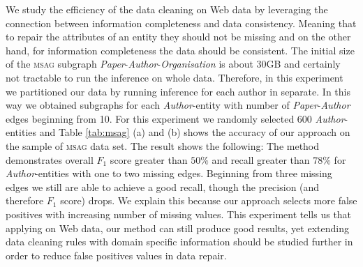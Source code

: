 We study the efficiency of the data cleaning on Web data by leveraging the connection between information completeness and data consistency. Meaning that to repair the attributes of an entity they should not be missing and on the other hand, for information completeness the data should be consistent. The initial size of the \textsc{msag} subgraph \textit{Paper}-\textit{Author}-\textit{Organisation} is about 30GB and certainly not tractable to run the inference on whole data. Therefore, in this experiment we partitioned our data by running inference for each author in separate. In this way we obtained subgraphs for each \textit{Author}-entity with number of \textit{Paper}-\textit{Author} edges beginning from 10. For this experiment we randomly selected 600 \textit{Author}-entities and Table \ref{tab:msag} (a) and (b) shows the accuracy of our approach on the sample of \textsc{msag} data set. The result shows the following: The method demonstrates overall $F_1$ score greater than $50\%$ and recall greater than $78\%$ for \textit{Author}-entities with one to two missing edges. Beginning from three missing edges we still are able to achieve a good recall, though the precision (and therefore $F_1$ score) drops. We explain this because our approach selects more false positives with increasing number of missing values. This experiment tells us that applying on Web data, our method can still produce good results, yet extending data cleaning rules with domain specific information should be studied further in order to reduce false positives values in data repair. 


